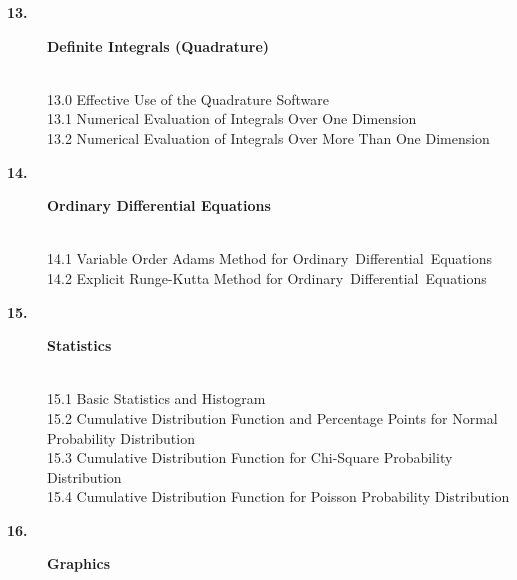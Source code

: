 \documentclass[twoside]{MATH77}
\begin{document}
\begin{description}
\item[\large \bf 13.] {\large {\bf Definite Integrals (Quadrature)}}

\vspace{-20pt}
\begin{tabbing}
\hspace{.45in}\=\\
13.0 \> Effective Use of the Quadrature Software\\
13.1 \> Numerical Evaluation of Integrals Over One Dimension\\
13.2 \> Numerical Evaluation of Integrals Over More Than One Dimension\\
\end{tabbing}\vspace{-15pt}

\newpage
\item[\large \bf 14.]  {\large {\bf Ordinary Differential Equations}}

\vspace{-20pt}
\begin{tabbing}
\hspace{.45in}\=\\
14.1 \> Variable Order Adams Method for Ordinary~Differential~Equations\\
14.2 \> Explicit Runge-Kutta Method for Ordinary~Differential~Equations\\
\end{tabbing}\vspace{-15pt}

\item[\large \bf 15.]  {\large {\bf Statistics}}

\vspace{-20pt}
\begin{tabbing}
\hspace{.45in}\=\\
15.1 \> Basic Statistics and Histogram\\
15.2 \> Cumulative Distribution Function and Percentage Points for
Normal Probability Distribution\\
15.3 \> Cumulative Distribution Function for Chi-Square Probability
Distribution\\
15.4 \> Cumulative Distribution Function for Poisson Probability
Distribution\\
\end{tabbing}\vspace{-15pt}

\item[\large \bf 16.]  {\large {\bf Graphics}}


\end{description}
\end{document}
